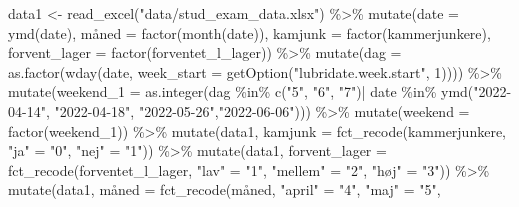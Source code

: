 \documentclass[
  12pt,
  a4paper,
  DIV=11,
  numbers=noendperiod]{scrartcl}
\newenvironment{Shaded}{\begin{snugshade}}{\end{snugshade}}
\newcommand{\AttributeTok}[1]{\textcolor[rgb]{0.40,0.45,0.13}{#1}}
\newcommand{\DecValTok}[1]{\textcolor[rgb]{0.68,0.00,0.00}{#1}}
\newcommand{\FunctionTok}[1]{\textcolor[rgb]{0.28,0.35,0.67}{#1}}
\newcommand{\NormalTok}[1]{\textcolor[rgb]{0.00,0.23,0.31}{#1}}
\newcommand{\OtherTok}[1]{\textcolor[rgb]{0.00,0.23,0.31}{#1}}
\newcommand{\SpecialCharTok}[1]{\textcolor[rgb]{0.37,0.37,0.37}{#1}}
\newcommand{\StringTok}[1]{\textcolor[rgb]{0.13,0.47,0.30}{#1}}
\begin{document}
\begin{Shaded}
\begin{Highlighting}[numbers=left,,]
\NormalTok{data1 }\OtherTok{\textless{}{-}} \FunctionTok{read\_excel}\NormalTok{(}\StringTok{"data/stud\_exam\_data.xlsx"}\NormalTok{) }\SpecialCharTok{\%\textgreater{}\%}
  \FunctionTok{mutate}\NormalTok{(}\AttributeTok{date =} \FunctionTok{ymd}\NormalTok{(date), måned }\OtherTok{=} \FunctionTok{factor}\NormalTok{(}\FunctionTok{month}\NormalTok{(date)),}
  \AttributeTok{kamjunk =} \FunctionTok{factor}\NormalTok{(kammerjunkere), }\AttributeTok{forvent\_lager =} 
  \FunctionTok{factor}\NormalTok{(forventet\_l\_lager)) }\SpecialCharTok{\%\textgreater{}\%}
  \FunctionTok{mutate}\NormalTok{(}\AttributeTok{dag =} \FunctionTok{as.factor}\NormalTok{(}\FunctionTok{wday}\NormalTok{(date, }\AttributeTok{week\_start =}
  \FunctionTok{getOption}\NormalTok{(}\StringTok{"lubridate.week.start"}\NormalTok{, }\DecValTok{1}\NormalTok{)))) }\SpecialCharTok{\%\textgreater{}\%}
  \FunctionTok{mutate}\NormalTok{(}\AttributeTok{weekend\_1 =} \FunctionTok{as.integer}\NormalTok{(dag }\SpecialCharTok{\%in\%} \FunctionTok{c}\NormalTok{(}\StringTok{"5"}\NormalTok{, }\StringTok{"6"}\NormalTok{, }\StringTok{"7"}\NormalTok{)}\SpecialCharTok{|}\NormalTok{ date }\SpecialCharTok{\%in\%}
  \FunctionTok{ymd}\NormalTok{(}\StringTok{"2022{-}04{-}14"}\NormalTok{, }\StringTok{"2022{-}04{-}18"}\NormalTok{, }\StringTok{"2022{-}05{-}26"}\NormalTok{,}\StringTok{"2022{-}06{-}06"}\NormalTok{))) }\SpecialCharTok{\%\textgreater{}\%}
  \FunctionTok{mutate}\NormalTok{(}\AttributeTok{weekend =} \FunctionTok{factor}\NormalTok{(weekend\_1)) }\SpecialCharTok{\%\textgreater{}\%} 
  \FunctionTok{mutate}\NormalTok{(data1, }\AttributeTok{kamjunk =} \FunctionTok{fct\_recode}\NormalTok{(kammerjunkere,}
                                      \StringTok{"ja"} \OtherTok{=} \StringTok{"0"}\NormalTok{, }
                                      \StringTok{"nej"} \OtherTok{=} \StringTok{"1"}\NormalTok{)) }\SpecialCharTok{\%\textgreater{}\%}
  \FunctionTok{mutate}\NormalTok{(data1, }\AttributeTok{forvent\_lager =} \FunctionTok{fct\_recode}\NormalTok{(forventet\_l\_lager,}
                                      \StringTok{"lav"} \OtherTok{=} \StringTok{"1"}\NormalTok{,}
                                      \StringTok{"mellem"} \OtherTok{=} \StringTok{"2"}\NormalTok{, }\StringTok{"høj"} \OtherTok{=} \StringTok{"3"}\NormalTok{)) }\SpecialCharTok{\%\textgreater{}\%}
  \FunctionTok{mutate}\NormalTok{(data1, måned }\OtherTok{=} \FunctionTok{fct\_recode}\NormalTok{(måned, }\StringTok{"april"} \OtherTok{=} \StringTok{"4"}\NormalTok{, }\StringTok{"maj"} \OtherTok{=} \StringTok{"5"}\NormalTok{,}

\end{Highlighting}
\end{Shaded}
\end{document}
